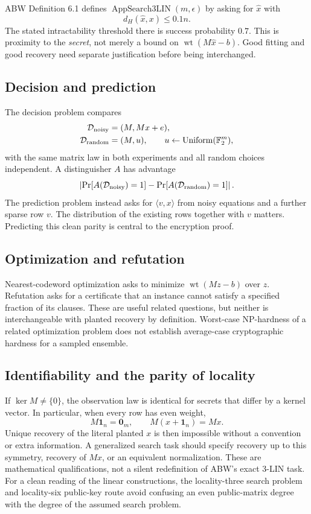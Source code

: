 \documentclass[11pt,a4paper]{article}
\newcommand{\F}{\mathbb F}
\newcommand{\wt}{\operatorname{wt}}
\newcommand{\App}{\operatorname{AppSearch3LIN}}
\newcommand{\one}{\mathbf 1}
\newcommand{\zero}{\mathbf 0}
\begin{document}
ABW Definition 6.1 defines $\App(m,\epsilon)$ by asking for $\widehat x$ with
\[
 d_H(\widehat x,x)\leq0.1n.
\]
The stated intractability threshold there is success probability $0.7$. This is proximity to the \emph{secret}, not merely a bound on $\wt(M\widehat x-b)$. Good fitting and good recovery need separate justification before being interchanged.

\subsection{Decision and prediction}
The decision problem compares
\begin{align}
 \mathcal D_{\rm noisy}&=(M,Mx+e),\\
 \mathcal D_{\rm random}&=(M,u),\qquad u\leftarrow\operatorname{Uniform}(\F_2^m),
\end{align}
with the same matrix law in both experiments and all random choices independent. A distinguisher $A$ has advantage
\[
 \left|\Pr[A(\mathcal D_{\rm noisy})=1]-\Pr[A(\mathcal D_{\rm random})=1]\right|.
\]
The prediction problem instead asks for $\langle v,x\rangle$ from noisy equations and a further sparse row $v$. The distribution of the existing rows together with $v$ matters. Predicting this clean parity is central to the encryption proof.

\subsection{Optimization and refutation}
Nearest-codeword optimization asks to minimize $\wt(Mz-b)$ over $z$. Refutation asks for a certificate that an instance cannot satisfy a specified fraction of its clauses. These are useful related questions, but neither is interchangeable with planted recovery by definition. Worst-case NP-hardness of a related optimization problem does not establish average-case cryptographic hardness for a sampled ensemble.

\subsection{Identifiability and the parity of locality}
If $\ker M\ne\{0\}$, the observation law is identical for secrets that differ by a kernel vector. In particular, when every row has even weight,
\[
 M\one_n=\zero_m,\qquad M(x+\one_n)=Mx.
\]
Unique recovery of the literal planted $x$ is then impossible without a convention or extra information. A generalized search task should specify recovery up to this symmetry, recovery of $Mx$, or an equivalent normalization. These are mathematical qualifications, not a silent redefinition of ABW's exact 3-LIN task. For a clean reading of the linear constructions, the locality-three search problem and locality-six public-key route avoid confusing an even public-matrix degree with the degree of the assumed search problem.
\end{document}
